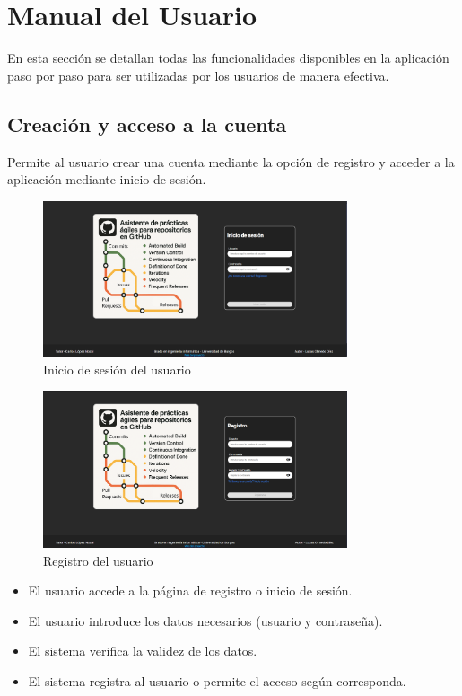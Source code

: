 \section{Manual del Usuario}
En esta sección se detallan todas las funcionalidades disponibles en la aplicación paso por paso para ser utilizadas por los usuarios de manera efectiva.

\subsection{Creación y acceso a la cuenta}

Permite al usuario crear una cuenta mediante la opción de registro y acceder a la aplicación mediante inicio de sesión.

\begin{figure}[H]
\centering
\includegraphics[width=0.8\textwidth]{img/E1-login.png}
\caption{Inicio de sesión del usuario}
\label{fig:E1-login}
\end{figure}

\begin{figure}[H]
\centering
\includegraphics[width=0.8\textwidth]{img/E2-register.png}
\caption{Registro del usuario}
\label{fig:E2-register}
\end{figure}

\begin{itemize}
    \item El usuario accede a la página de registro o inicio de sesión.
    \item El usuario introduce los datos necesarios (usuario y contraseña).
    \item El sistema verifica la validez de los datos.
    \item El sistema registra al usuario o permite el acceso según corresponda.
\end{itemize}

